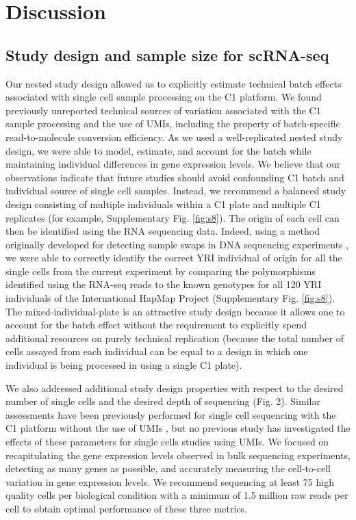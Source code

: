 \section{Discussion}\label{discussion}

\subsection{Study design and sample size for
scRNA-seq}\label{study-design-and-sample-size-for-scrna-seq}

Our nested study design allowed us to explicitly estimate technical
batch effects associated with single cell sample processing on the C1
platform. We found previously unreported technical sources of variation
associated with the C1 sample processing and the use of UMIs, including
the property of batch-specific read-to-molecule conversion efficiency.
As we used a well-replicated nested study design, we were able to model,
estimate, and account for the batch while maintaining individual
differences in gene expression levels. We believe that our observations
indicate that future studies should avoid confounding C1 batch and
individual source of single cell samples. Instead, we recommend a
balanced study design consisting of multiple individuals within a C1
plate and multiple C1 replicates (for example, Supplementary Fig. \ref{fig:s8}).
The origin of each cell can then be identified using the RNA sequencing
data. Indeed, using a method originally developed for detecting sample
swaps in DNA sequencing experiments \citep{Jun2012}, we were able to
correctly identify the correct YRI individual of origin for all the
single cells from the current experiment by comparing the polymorphisms
identified using the RNA-seq reads to the known genotypes for all 120
YRI individuals of the International HapMap Project
\citep{HapMapConsortium2005} (Supplementary Fig. \ref{fig:s8}). The
mixed-individual-plate is an attractive study design because it allows
one to account for the batch effect without the requirement to
explicitly spend additional resources on purely technical replication
(because the total number of cells assayed from each individual can be
equal to a design in which one individual is being processed in using a
single C1 plate).

We also addressed additional study design properties with respect to the
desired number of single cells and the desired depth of sequencing (Fig.
2). Similar assessments have been previously performed for single cell
sequencing with the C1 platform without the use of UMIs \citep{Wu2014,
Pollen2014}, but no previous study has investigated the effects of
these parameters for single cells studies using UMIs. We focused on
recapitulating the gene expression levels observed in bulk sequencing
experiments, detecting as many genes as possible, and accurately
measuring the cell-to-cell variation in gene expression levels. We
recommend sequencing at least 75 high quality cells per biological
condition with a minimum of 1.5 million raw reads per cell to obtain
optimal performance of these three metrics.

